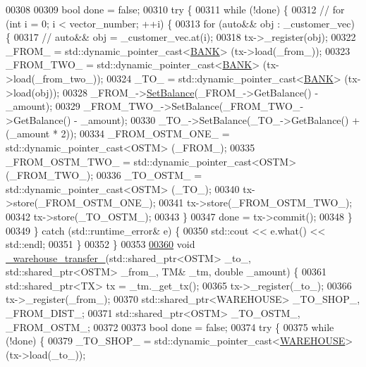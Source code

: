 \begin{DoxyCode}
00308 
00309     \textcolor{keywordtype}{bool} done = \textcolor{keyword}{false};
00310     \textcolor{keywordflow}{try} \{
00311         \textcolor{keywordflow}{while} (!done) \{
00312             \textcolor{comment}{// for (int i = 0; i < vector\_number; ++i) \{}
00313             \textcolor{keywordflow}{for} (\textcolor{keyword}{auto}&& obj : \_customer\_vec) \{
00317                 \textcolor{comment}{// auto&& obj = \_customer\_vec.at(i);}
00318                 tx->\_register(obj);
00322                 \_FROM\_ = std::dynamic\_pointer\_cast<\hyperlink{class_b_a_n_k}{BANK}> (tx->load(\_from\_));
00323                 \_FROM\_TWO\_ = std::dynamic\_pointer\_cast<\hyperlink{class_b_a_n_k}{BANK}> (tx->load(\_from\_two\_));
00324                 \_TO\_ = std::dynamic\_pointer\_cast<\hyperlink{class_b_a_n_k}{BANK}> (tx->load(obj));
00328                 \_FROM\_->\hyperlink{class_b_a_n_k_a43bef9f486c88a2dc4906eee0e38a394}{SetBalance}(\_FROM\_->GetBalance() - \_amount);
00329                 \_FROM\_TWO\_->SetBalance(\_FROM\_TWO\_->GetBalance() - \_amount);
00330                 \_TO\_->SetBalance(\_TO\_->GetBalance() + (\_amount * 2));
00334                 \_FROM\_OSTM\_ONE\_ = std::dynamic\_pointer\_cast<OSTM> (\_FROM\_);
00335                 \_FROM\_OSTM\_TWO\_ = std::dynamic\_pointer\_cast<OSTM> (\_FROM\_TWO\_);
00336                 \_TO\_OSTM\_ = std::dynamic\_pointer\_cast<OSTM> (\_TO\_);
00340                 tx->store(\_FROM\_OSTM\_ONE\_);
00341                 tx->store(\_FROM\_OSTM\_TWO\_);
00342                 tx->store(\_TO\_OSTM\_);
00343             \}
00347             done = tx->commit();
00348         \}
00349     \} \textcolor{keywordflow}{catch} (std::runtime\_error& e) \{
00350         std::cout << e.what() << std::endl;
00351     \}
00352 \}
00353 
\hypertarget{main_8cpp_source.tex_l00360}{}\hyperlink{main_8cpp_a1c170f18aac9dbb8aba1ad2f7e4619cc}{00360} \textcolor{keywordtype}{void} \hyperlink{main_8cpp_a1c170f18aac9dbb8aba1ad2f7e4619cc}{\_warehouse\_transfer\_}(std::shared\_ptr<OSTM> \_to\_, std::shared\_ptr<OSTM> \_from\_, TM&
       \_tm, \textcolor{keywordtype}{double} \_amount) \{
00361     std::shared\_ptr<TX> tx = \_tm.\_get\_tx();
00365     tx->\_register(\_to\_);
00366     tx->\_register(\_from\_);
00370     std::shared\_ptr<WAREHOUSE> \_TO\_SHOP\_, \_FROM\_DIST\_;
00371     std::shared\_ptr<OSTM> \_TO\_OSTM\_, \_FROM\_OSTM\_;
00372 
00373     \textcolor{keywordtype}{bool} done = \textcolor{keyword}{false};
00374     \textcolor{keywordflow}{try} \{
00375         \textcolor{keywordflow}{while} (!done) \{
00379             \_TO\_SHOP\_ = std::dynamic\_pointer\_cast<\hyperlink{class_w_a_r_e_h_o_u_s_e}{WAREHOUSE}> (tx->load(\_to\_));

\end{DoxyCode}
